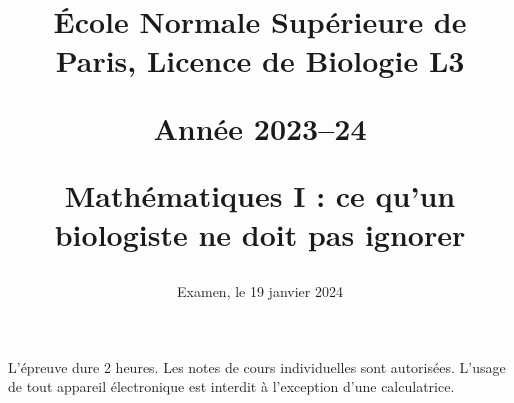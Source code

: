 \documentclass[french, 9pt]{article}
\title{\normalsize{\sc École Normale Supérieure de Paris, Licence de Biologie L3}
  
  \bigskip
  \normalsize{\sc Année 2023–24}
  
  \bigskip
  \large{\bf Mathématiques I : ce qu’un biologiste ne doit pas ignorer} 
  
}
\date{Examen, le 19 janvier 2024}
\newcommand{\alglin}{/home/robin/ENSEIGN/Cours/MathBiologie/L3-ENS-Math1/Exercices/AlgLin}
\newcommand{\multivar}{/home/robin/ENSEIGN/Cours/MathBiologie/L3-ENS-Math1/Exercices/MultiVar}
\newcommand{\equadiff}{/home/robin/ENSEIGN/Cours/MathBiologie/L3-ENS-Math1/Exercices/EquaDiff}
\newcommand{\probas}{/home/robin/ENSEIGN/Cours/MathBiologie/L3-ENS-Math1/Exercices/Probas}
\begin{document}

\maketitle

\bigskip
L'épreuve dure 2 heures. 
Les notes de cours individuelles sont autorisées.
L’usage de tout appareil électronique est interdit à l’exception d’une calculatrice.

% 

% 

\bigskip \bigskip 


\bigskip \bigskip 


\bigskip \bigskip 



\end{document}
